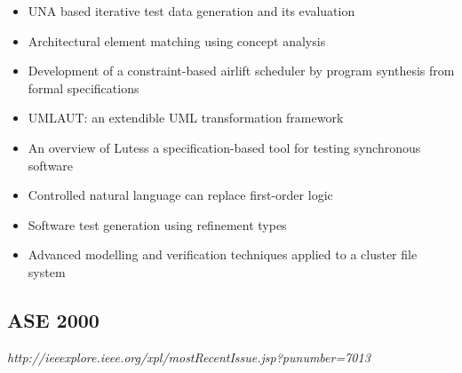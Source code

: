 {\begin{itemize}[itemsep=-1ex]
  \item UNA based iterative test data generation and its evaluation
  \item Architectural element matching using concept analysis
  \item Development of a constraint-based airlift scheduler by program synthesis from formal specifications
  \item UMLAUT: an extendible UML transformation framework
  \item An overview of Lutess a specification-based tool for testing synchronous software
  \item Controlled natural language can replace first-order logic
  \item Software test generation using refinement types
  \item Advanced modelling and verification techniques applied to a cluster file system 
\end{itemize}
}

\subsection{ASE 2000}

{\small \em http://ieeexplore.ieee.org/xpl/mostRecentIssue.jsp?punumber=7013}

